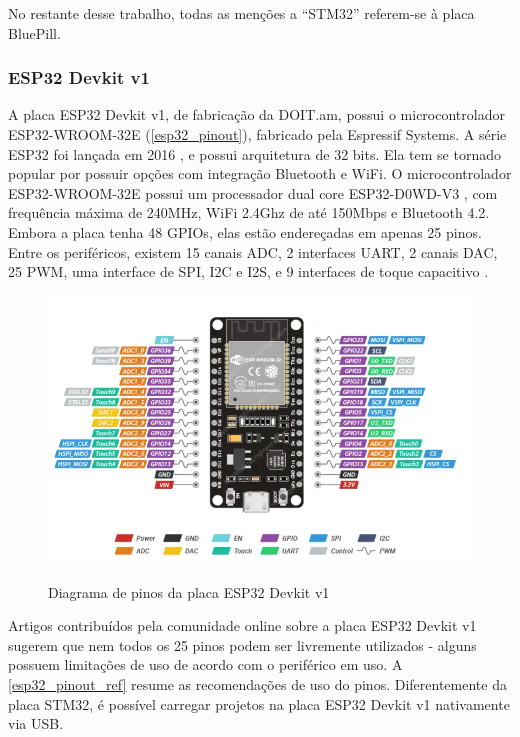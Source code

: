 No restante desse trabalho, todas as menções a ``STM32'' referem-se à placa
BluePill.


\subsubsection{ESP32 Devkit v1} \label{ESP32_referencia}

A placa ESP32 Devkit v1, de fabricação da DOIT.am, possui o microcontrolador
ESP32-WROOM-32E (\autoref{esp32_pinout}), fabricado pela Espressif Systems.
A série ESP32 foi lançada em 2016 \cite{anuncio_esp32}, e possui arquitetura de
32 bits. Ela tem se tornado popular por possuir opções com integração Bluetooth
e WiFi. O microcontrolador ESP32-WROOM-32E possui um processador dual core
ESP32-D0WD-V3 \cite{esp32_wroom_32e_datasheet}, com frequência máxima de 240MHz,
WiFi 2.4Ghz de até 150Mbps e Bluetooth 4.2. Embora a placa tenha 48 GPIOs, elas
estão endereçadas em apenas 25 pinos. Entre os periféricos, existem 15 canais
ADC, 2 interfaces UART, 2 canais DAC, 25 PWM, uma interface de SPI, I2C e I2S,
e 9 interfaces de toque capacitivo
\cite{esp32_reference_2,esp32_reference}.

\begin{figure}[ht]
	\centering
	\caption{Diagrama de pinos da placa ESP32 Devkit v1}
	\includegraphics[width=1.0\textwidth]{figures/esp32_pinout}
	\label{esp32_pinout}
\end{figure}

Artigos contribuídos pela comunidade online sobre a placa ESP32 Devkit v1 
\cite{esp32_reference_2,esp32_reference} sugerem que nem todos os 25
pinos podem ser livremente utilizados - alguns possuem limitações de uso de
acordo com o periférico em uso. A \autoref{esp32_pinout_ref} resume as
recomendações de uso do pinos. Diferentemente da placa STM32, é possível
carregar projetos na placa ESP32 Devkit v1 nativamente via USB.

